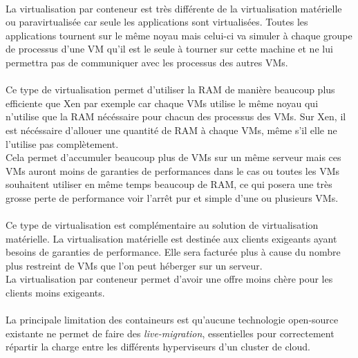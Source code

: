 \paragraph*{}
La virtualisation par conteneur est très différente de la virtualisation matérielle ou paravirtualisée car seule les applications sont virtualisées.
Toutes les applications tournent sur le même noyau mais celui-ci va simuler à chaque groupe de processus d'une VM qu'il est le seule à tourner sur
cette machine et ne lui permettra pas de communiquer avec les processus des autres VMs.

\paragraph*{}
Ce type de virtualisation permet d'utiliser la RAM de manière beaucoup plus efficiente que Xen par exemple car chaque VMs utilise le même noyau qui n'utilise
que la RAM nécéssaire pour chacun des processus des VMs. Sur Xen, il est nécéssaire d'allouer une quantité de RAM à chaque VMs, même s'il elle ne l'utilise pas complètement.
\\
Cela permet d'accumuler beaucoup plus de VMs sur un même serveur mais ces VMs auront moins de garanties de performances dans le cas ou toutes les VMs souhaitent utiliser
en même temps beaucoup de RAM, ce qui posera une très grosse perte de performance voir l'arrêt pur et simple d'une ou plusieurs VMs.

\paragraph*{}
Ce type de virtualisation est complémentaire au solution de virtualisation matérielle. La virtualisation matérielle est destinée aux clients exigeants ayant besoins de garanties
de performance. Elle sera facturée plus à cause du nombre plus restreint de VMs que l'on peut héberger sur un serveur.
\\
La virtualisation par conteneur permet d'avoir une offre moins chère pour les clients moins exigeants.

\paragraph*{}
La principale limitation des containeurs est qu'aucune technologie open-source existante ne permet de faire des \emph{live-migration}, essentielles pour correctement répartir
la charge entre les différents hyperviseurs d'un cluster de cloud.

